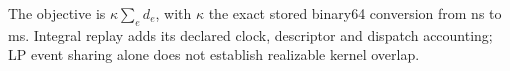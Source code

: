 
The objective is $\kappa\sum_e d_e$, with $\kappa$ the exact stored binary64 conversion from ns to ms.
Integral replay adds its declared clock, descriptor and dispatch accounting; LP event sharing alone does not establish realizable kernel overlap.


